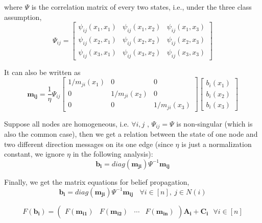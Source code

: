 where $\Psi$ is the correlation matrix of every two states, i.e., under the three class assumption,
\begin{equation}
\Psi_{ij} = \left[ \begin{array}{ccc}
\psi_{ij}(x_1,x_1)&\psi_{ij}(x_1,x_2)&\psi_{ij}(x_1,x_3) \\
\psi_{ij}(x_2,x_1)&\psi_{ij}(x_2,x_2)&\psi_{ij}(x_2,x_3) \\
\psi_{ij}(x_3,x_1)&\psi_{ij}(x_3,x_2)&\psi_{ij}(x_3,x_3) \end{array} \right]
\end{equation}

It can also be written as
\begin{equation}
\mathbf{m_{ij}} = \frac{1}{\eta} \Psi_{ij} \left[ \begin{array}{ccc}
1/m_{ji}(x_1)&0&0 \\
0 &1/m_{ji}(x_2)&0 \\
0& 0 &1/m_{ji}(x_3) \end{array} \right] \left[ \begin{array}{c}
b_i(x_1)\\
b_i(x_2)\\
b_i(x_3)\end{array} \right]
\end{equation}

Suppose all nodes are homogeneous, i.e. $\forall i,j$ , $\Psi_{ij} = \Psi$ is non-singular (which is also the common case), then we get a relation between the state of one node and two different direction messages on its one edge (since $\eta$ is just a normalization constant, we ignore $\eta$ in the following analysis):
\begin{equation}
\mathbf{b_i} = diag(\mathbf{m_{ji}})\Psi^{-1}\mathbf{m_{ij}}
\end{equation}

Finally, we get the matrix equations for belief propagation,
\begin{equation}
\label{equ:bfnewrule_b}
\mathbf{b_i} = diag(\mathbf{m_{ji}})\Psi^{-1}\mathbf{m_{ij}}~~~~\forall i\in [n],~j\in N(i)
\end{equation}

\begin{equation}
\label{equ:bfnewrule_m}
F(\mathbf{b_i})=
\left( \begin{array}{cccc}
F(\mathbf{m_{i1}})&F(\mathbf{m_{i2}})&\cdots& F(\mathbf{m_{in}})\end{array} \right)\mathbf{A_i}+\mathbf{C_i}~~~\forall i\in [n]
\end{equation}

